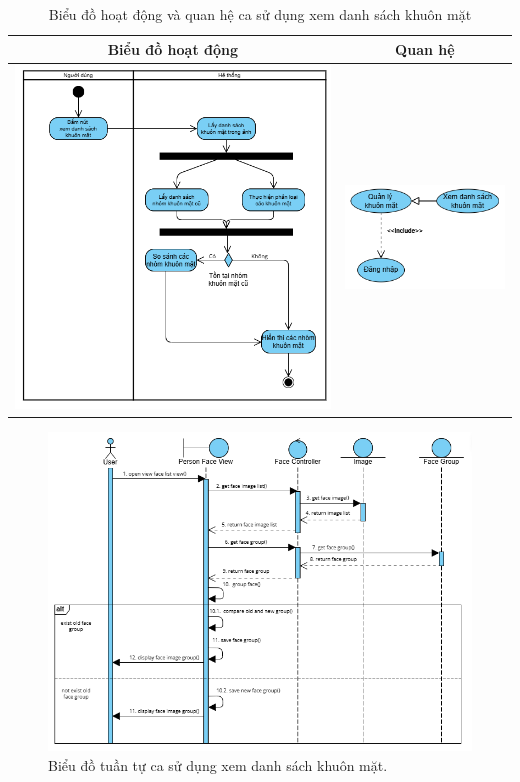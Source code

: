 \vspace{0.8cm}

\noindent 
\begin{table}[H]
\centering
\caption{Biểu đồ hoạt động và quan hệ ca sử dụng xem danh sách khuôn mặt}
\label{tab:view-face-usecase-activity}
\begin{tabular}{| c | c |}
    \hline
    \textbf{Biểu đồ hoạt động} & \textbf{Quan hệ} \\ 
    \hline
    \includegraphics[width=0.6\linewidth]{figures/c3/3-3-10-activity-diagram.png} 
    &  
    \includegraphics[width=0.35\linewidth]{figures/c3/3-3-10-relationship.png} \\ 
    \hline
\end{tabular}
\end{table}

\begin{figure}[H]
    \centering  
    \includegraphics[width=1\textwidth]{figures/c3/3-3-10-sequence-diagram.png}
    \caption{Biểu đồ tuần tự ca sử dụng xem danh sách khuôn mặt.}
    \label{fig:3-3-10-sequence-diagram}
\end{figure}